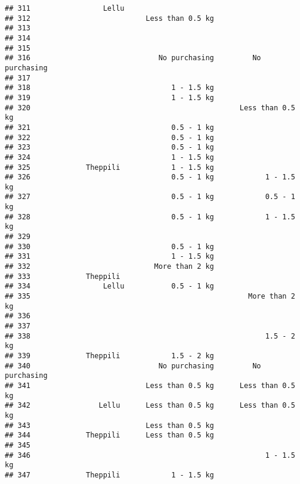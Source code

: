\documentclass[
]{article}
\begin{document}
\begin{verbatim}
## 311                 Lellu                                           
## 312                           Less than 0.5 kg                      
## 313                                                                 
## 314                                                                 
## 315                                                                 
## 316                              No purchasing         No purchasing
## 317                                                                 
## 318                                 1 - 1.5 kg                      
## 319                                 1 - 1.5 kg                      
## 320                                                 Less than 0.5 kg
## 321                                 0.5 - 1 kg                      
## 322                                 0.5 - 1 kg                      
## 323                                 0.5 - 1 kg                      
## 324                                 1 - 1.5 kg                      
## 325             Theppili            1 - 1.5 kg                      
## 326                                 0.5 - 1 kg            1 - 1.5 kg
## 327                                 0.5 - 1 kg            0.5 - 1 kg
## 328                                 0.5 - 1 kg            1 - 1.5 kg
## 329                                                                 
## 330                                 0.5 - 1 kg                      
## 331                                 1 - 1.5 kg                      
## 332                             More than 2 kg                      
## 333             Theppili                                            
## 334                 Lellu           0.5 - 1 kg                      
## 335                                                   More than 2 kg
## 336                                                                 
## 337                                                                 
## 338                                                       1.5 - 2 kg
## 339             Theppili            1.5 - 2 kg                      
## 340                              No purchasing         No purchasing
## 341                           Less than 0.5 kg      Less than 0.5 kg
## 342                Lellu      Less than 0.5 kg      Less than 0.5 kg
## 343                           Less than 0.5 kg                      
## 344             Theppili      Less than 0.5 kg                      
## 345                                                                 
## 346                                                       1 - 1.5 kg
## 347             Theppili            1 - 1.5 kg                      

\end{verbatim}
\end{document}

